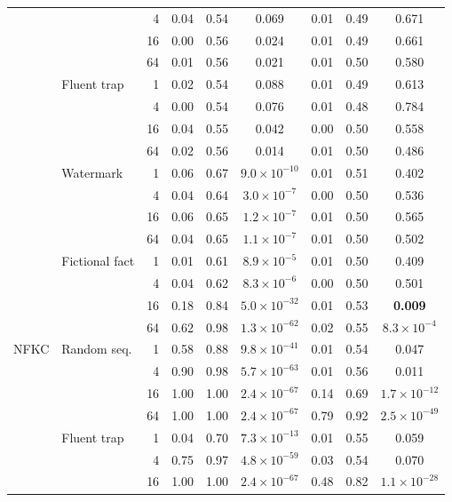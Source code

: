 \begin{tabular}{llrcccccc}
 &  & 4 & 0.04 & 0.54 & 0.069 & 0.01 & 0.49 & 0.671 \\
 &  & 16 & 0.00 & 0.56 & 0.024 & 0.01 & 0.49 & 0.661 \\
 &  & 64 & 0.01 & 0.56 & 0.021 & 0.01 & 0.50 & 0.580 \\
 & Fluent trap & 1 & 0.02 & 0.54 & 0.088 & 0.01 & 0.49 & 0.613 \\
 &  & 4 & 0.00 & 0.54 & 0.076 & 0.01 & 0.48 & 0.784 \\
 &  & 16 & 0.04 & 0.55 & 0.042 & 0.00 & 0.50 & 0.558 \\
 &  & 64 & 0.02 & 0.56 & 0.014 & 0.01 & 0.50 & 0.486 \\
 & Watermark & 1 & 0.06 & 0.67 & \textbf{$9.0{\times}10^{-10}$} & 0.01 & 0.51 & 0.402 \\
 &  & 4 & 0.04 & 0.64 & \textbf{$3.0{\times}10^{-7}$} & 0.00 & 0.50 & 0.536 \\
 &  & 16 & 0.06 & 0.65 & \textbf{$1.2{\times}10^{-7}$} & 0.01 & 0.50 & 0.565 \\
 &  & 64 & 0.04 & 0.65 & \textbf{$1.1{\times}10^{-7}$} & 0.01 & 0.50 & 0.502 \\
 & Fictional fact & 1 & 0.01 & 0.61 & \textbf{$8.9{\times}10^{-5}$} & 0.01 & 0.50 & 0.409 \\
 &  & 4 & 0.04 & 0.62 & \textbf{$8.3{\times}10^{-6}$} & 0.00 & 0.50 & 0.501 \\
 &  & 16 & 0.18 & 0.84 & \textbf{$5.0{\times}10^{-32}$} & 0.01 & 0.53 & \textbf{0.009} \\
 &  & 64 & 0.62 & 0.98 & \textbf{$1.3{\times}10^{-62}$} & 0.02 & 0.55 & \textbf{$8.3{\times}10^{-4}$} \\
\midrule
NFKC & Random seq. & 1 & 0.58 & 0.88 & \textbf{$9.8{\times}10^{-41}$} & 0.01 & 0.54 & 0.047 \\
 &  & 4 & 0.90 & 0.98 & \textbf{$5.7{\times}10^{-63}$} & 0.01 & 0.56 & 0.011 \\
 &  & 16 & 1.00 & 1.00 & \textbf{$2.4{\times}10^{-67}$} & 0.14 & 0.69 & \textbf{$1.7{\times}10^{-12}$} \\
 &  & 64 & 1.00 & 1.00 & \textbf{$2.4{\times}10^{-67}$} & 0.79 & 0.92 & \textbf{$2.5{\times}10^{-49}$} \\
 & Fluent trap & 1 & 0.04 & 0.70 & \textbf{$7.3{\times}10^{-13}$} & 0.01 & 0.55 & 0.059 \\
 &  & 4 & 0.75 & 0.97 & \textbf{$4.8{\times}10^{-59}$} & 0.03 & 0.54 & 0.070 \\
 &  & 16 & 1.00 & 1.00 & \textbf{$2.4{\times}10^{-67}$} & 0.48 & 0.82 & \textbf{$1.1{\times}10^{-28}$} \\

\end{tabular}
